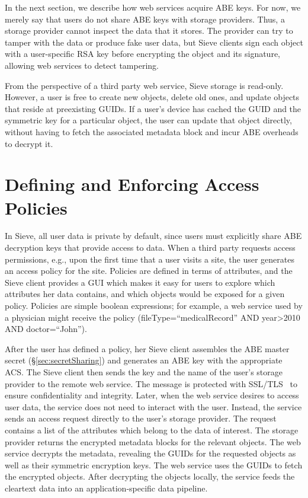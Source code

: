 In the next section, we describe how web services
acquire ABE keys. For now, we merely say that
users do not share ABE keys with storage providers.
Thus, a storage provider cannot inspect the data
that it stores. The provider can try to tamper
with the data or produce fake user data, but
Sieve clients sign each object with a user-specific
RSA key before encrypting the object and its signature, 
allowing web services to detect tampering.

From the perspective of a third party
web service, Sieve storage is read-only.
However, a user is free to create new
objects, delete old ones, and update
objects that reside at preexisting
GUIDs. If a user's device has cached
the GUID and the symmetric key for a
particular object, the user can update
that object directly, without having
to fetch the associated metadata block
and incur ABE overheads to decrypt it.

\section{Defining and Enforcing Access Policies}
\label{sec:policies}

In Sieve, all user data is private by
default, since users must explicitly
share ABE decryption keys that provide
access to data. When a third party requests
access permissions, e.g., upon the first
time that a user visits a site, the user
generates an access policy for the site.
Policies are defined in terms of attributes,
and the Sieve client provides a GUI which
makes it easy for users to explore which
attributes her data contains, and which
objects would be exposed for a given policy.
Policies are simple boolean expressions;
for example, a web service used by a
physician might receive the policy
(fileType=``medicalRecord''
AND year>2010 AND doctor=``John'').

After the user has defined a policy, her
Sieve client assembles the ABE master secret
(\S\ref{sec:secretSharing}) and generates
an ABE key with the appropriate ACS. The
Sieve client then sends the key and the name
of the user's storage provider to the remote
web service. The message is protected with SSL/TLS~\cite{tls}
to ensure confidentiality and integrity.
Later, when the web service desires to
access user data, the service does not
need to interact with the user. Instead,
the service sends an access request directly
to the
user's storage provider. The request
contains a list of the attributes which
belong to the data of interest. The
storage provider returns the encrypted
metadata blocks for the relevant objects.
The web service decrypts the metadata,
revealing the GUIDs for the requested
objects as well as their symmetric
encryption keys. The web service uses the
GUIDs to fetch the encrypted objects.
After decrypting the objects locally,
the service feeds the cleartext data
into an application-specific data pipeline.

